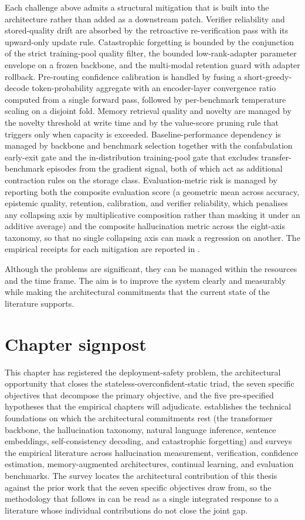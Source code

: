 Each challenge above admits a structural mitigation that is built into the architecture rather than added as a downstream patch. Verifier reliability and stored-quality drift are absorbed by the retroactive re-verification pass with its upward-only update rule. Catastrophic forgetting is bounded by the conjunction of the strict training-pool quality filter, the bounded low-rank-adapter parameter envelope on a frozen backbone, and the multi-modal retention guard with adapter rollback. Pre-routing confidence calibration is handled by fusing a short-greedy-decode token-probability aggregate with an encoder-layer convergence ratio computed from a single forward pass, followed by per-benchmark temperature scaling on a disjoint fold. Memory retrieval quality and novelty are managed by the novelty threshold at write time and by the value-score pruning rule that triggers only when capacity is exceeded. Baseline-performance dependency is managed by backbone and benchmark selection together with the confabulation early-exit gate and the in-distribution training-pool gate that excludes transfer-benchmark episodes from the gradient signal, both of which act as additional contraction rules on the storage class. Evaluation-metric risk is managed by reporting both the composite evaluation score (a geometric mean across accuracy, epistemic quality, retention, calibration, and verifier reliability, which penalises any collapsing axis by multiplicative composition rather than masking it under an additive average) and the composite hallucination metric across the eight-axis taxonomy, so that no single collapsing axis can mask a regression on another. The empirical receipts for each mitigation are reported in .

Although the problems are significant, they can be managed within the resources and the time frame. The aim is to improve the system clearly and measurably while making the architectural commitments that the current state of the literature supports.

\section{Chapter signpost}
\label{sec:ch1-signpost}

This chapter has registered the deployment-safety problem, the architectural opportunity that closes the stateless-overconfident-static triad, the seven specific objectives that decompose the primary objective, and the five pre-specified hypotheses that the empirical chapters will adjudicate.  establishes the technical foundations on which the architectural commitments rest (the transformer backbone, the hallucination taxonomy, natural language inference, sentence embeddings, self-consistency decoding, and catastrophic forgetting) and surveys the empirical literature across hallucination measurement, verification, confidence estimation, memory-augmented architectures, continual learning, and evaluation benchmarks. The survey locates the architectural contribution of this thesis against the prior work that the seven specific objectives draw from, so the methodology that follows in  can be read as a single integrated response to a literature whose individual contributions do not close the joint gap.